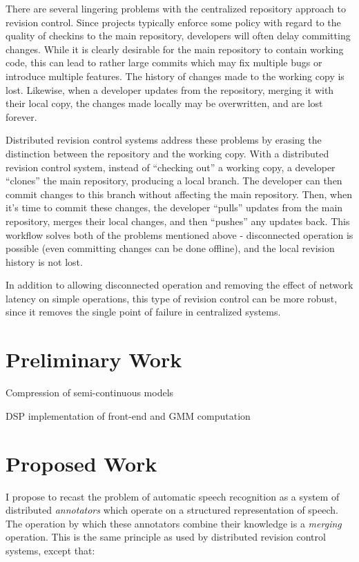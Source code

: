 \documentclass{article}
\begin{document}
There are several lingering problems with the centralized repository
approach to revision control.  Since projects typically enforce some
policy with regard to the quality of checkins to the main repository,
developers will often delay committing changes.  While it is clearly
desirable for the main repository to contain working code, this can
lead to rather large commits which may fix multiple bugs or introduce
multiple features.  The history of changes made to the working copy is
lost.  Likewise, when a developer updates from the repository, merging
it with their local copy, the changes made locally may be overwritten,
and are lost forever.

Distributed revision control systems address these problems by erasing
the distinction between the repository and the working copy.  With a
distributed revision control system, instead of ``checking out'' a
working copy, a developer ``clones'' the main repository, producing a
local branch.  The developer can then commit changes to this branch
without affecting the main repository.  Then, when it's time to commit
these changes, the developer ``pulls'' updates from the main
repository, merges their local changes, and then ``pushes'' any
updates back.  This workflow solves both of the problems mentioned
above - disconnected operation is possible (even committing changes
can be done offline), and the local revision history is not lost.

In addition to allowing disconnected operation and removing the effect
of network latency on simple operations, this type of revision control
can be more robust, since it removes the single point of failure in
centralized systems.

\section{Preliminary Work}
\label{sec:prelim}

Compression of semi-continuous models

DSP implementation of front-end and GMM computation

\section{Proposed Work}
\label{sec:proposed}

I propose to recast the problem of automatic speech recognition as a
system of distributed {\em annotators} which operate on a structured
representation of speech.  The operation by which these annotators
combine their knowledge is a {\em merging} operation.  This is the
same principle as used by distributed revision control systems, except
that:
\end{document}
